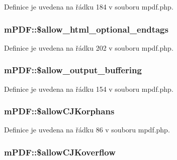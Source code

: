 Definice je uvedena na řádku 184 v souboru mpdf.\-php.

\hypertarget{classm_p_d_f_a961f0e4ee9725232a52cb5b38efffc02}{
\subsubsection[{\$allow\-\_\-html\-\_\-optional\-\_\-endtags}]{\setlength{\rightskip}{0pt plus 5cm}m\-P\-D\-F\-::\$allow\-\_\-html\-\_\-optional\-\_\-endtags}}\label{classm_p_d_f_a961f0e4ee9725232a52cb5b38efffc02}


Definice je uvedena na řádku 202 v souboru mpdf.\-php.

\hypertarget{classm_p_d_f_af3eab47d1b1b923c622b8d05271fcea7}{
\subsubsection[{\$allow\-\_\-output\-\_\-buffering}]{\setlength{\rightskip}{0pt plus 5cm}m\-P\-D\-F\-::\$allow\-\_\-output\-\_\-buffering}}\label{classm_p_d_f_af3eab47d1b1b923c622b8d05271fcea7}


Definice je uvedena na řádku 154 v souboru mpdf.\-php.

\hypertarget{classm_p_d_f_a2ffe0c1b5af4f1a3dfe1ed166996537f}{
\subsubsection[{\$allow\-C\-J\-Korphans}]{\setlength{\rightskip}{0pt plus 5cm}m\-P\-D\-F\-::\$allow\-C\-J\-Korphans}}\label{classm_p_d_f_a2ffe0c1b5af4f1a3dfe1ed166996537f}


Definice je uvedena na řádku 86 v souboru mpdf.\-php.

\hypertarget{classm_p_d_f_a895d2fb1060a1daa2126aa182d2605ab}{
\subsubsection[{\$allow\-C\-J\-Koverflow}]{\setlength{\rightskip}{0pt plus 5cm}m\-P\-D\-F\-::\$allow\-C\-J\-Koverflow}}\label{classm_p_d_f_a895d2fb1060a1daa2126aa182d2605ab}


